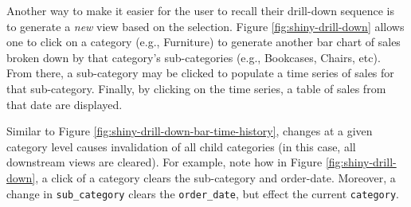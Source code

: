 \documentclass[
  12pt,
]{krantz}
\begin{document}
Another way to make it easier for the user to recall their drill-down sequence is to generate a \emph{new} view based on the selection. Figure \ref{fig:shiny-drill-down} allows one to click on a category (e.g., Furniture) to generate another bar chart of sales broken down by that category's sub-categories (e.g., Bookcases, Chairs, etc). From there, a sub-category may be clicked to populate a time series of sales for that sub-category. Finally, by clicking on the time series, a table of sales from that date are displayed.

Similar to Figure \ref{fig:shiny-drill-down-bar-time-history}, changes at a given category level causes invalidation of all child categories (in this case, all downstream views are cleared). For example, note how in Figure \ref{fig:shiny-drill-down}, a click of a category clears the sub-category and order-date. Moreover, a change in \texttt{sub\_category} clears the \texttt{order\_date}, but effect the current \texttt{category}.
\end{document}
